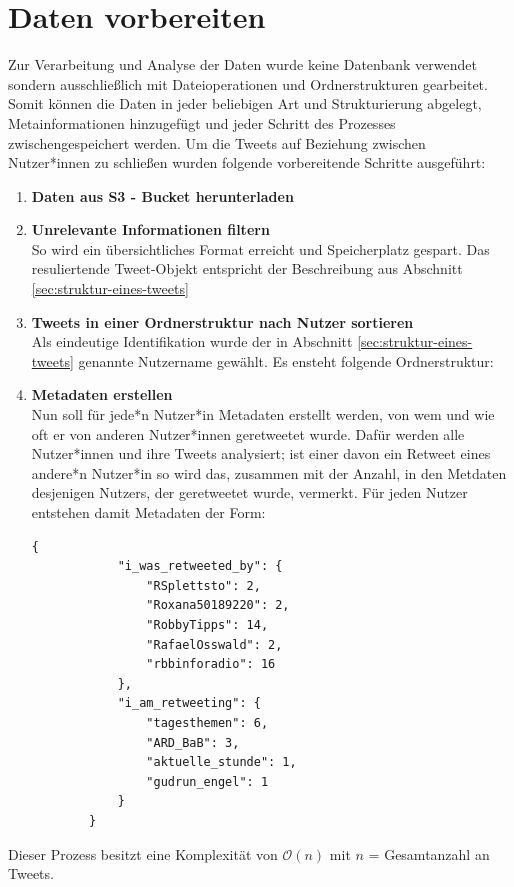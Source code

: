 \section{Daten vorbereiten}
\label{sec:daten-vorbereiten}
Zur Verarbeitung und Analyse der Daten wurde keine Datenbank verwendet sondern ausschließlich mit Dateioperationen und Ordnerstrukturen gearbeitet. Somit können die Daten in jeder beliebigen Art und Strukturierung abgelegt, Metainformationen hinzugefügt und jeder Schritt des Prozesses zwischengespeichert werden. 
Um die Tweets auf Beziehung zwischen Nutzer*innen zu schließen wurden folgende vorbereitende Schritte ausgeführt:
\begin{enumerate}
	\item \textbf{Daten aus \gls{S3 - Bucket} herunterladen}
	\item \textbf{Unrelevante Informationen filtern}\\  So wird ein übersichtliches Format erreicht und Speicherplatz gespart. Das resuliertende Tweet-Objekt entspricht der Beschreibung aus Abschnitt \ref{sec:struktur-eines-tweets}
	\item \textbf{Tweets in einer Ordnerstruktur nach Nutzer sortieren\\} Als eindeutige Identifikation wurde der in Abschnitt \ref{sec:struktur-eines-tweets} genannte Nutzername gewählt. Es ensteht folgende Ordnerstruktur: \\
	\item \textbf{Metadaten erstellen}\\
	Nun soll für jede*n Nutzer*in Metadaten erstellt werden, von wem und wie oft er von anderen Nutzer*innen \gls{geretweetet} wurde.
	Dafür werden alle Nutzer*innen und ihre Tweets analysiert; ist einer davon ein \gls{Retweet} eines andere*n Nutzer*in so wird das, zusammen mit der Anzahl, in den Metdaten desjenigen Nutzers, der \gls{geretweetet} wurde, vermerkt. 
	Für jeden Nutzer entstehen damit Metadaten der Form:
	
	\begin{lstlisting}[caption={Metdaten des Nutzer: "`tagesschau"'}]
		{
			"i_was_retweeted_by": {
				"RSplettsto": 2,
				"Roxana50189220": 2,
				"RobbyTipps": 14,
				"RafaelOsswald": 2,
				"rbbinforadio": 16
			},
			"i_am_retweeting": {
				"tagesthemen": 6,
				"ARD_BaB": 3,
				"aktuelle_stunde": 1,
				"gudrun_engel": 1
			}
		}
	\end{lstlisting}
\end{enumerate}
Dieser Prozess besitzt eine Komplexität von $\mathcal{O}(n)$ mit $n$ = Gesamtanzahl an Tweets. 
